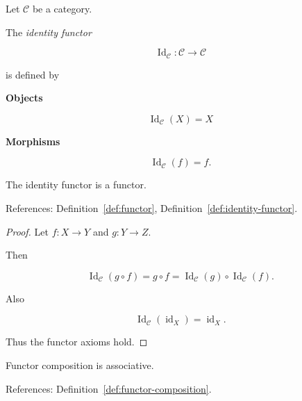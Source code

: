 \begin{definition}
\label{def:identity-functor}

Let $\mathcal{C}$ be a category.

The \emph{identity functor}

$$
\operatorname{Id}_{\mathcal{C}} : \mathcal{C} \to \mathcal{C}
$$

is defined by

\textbf{Objects}

$$
\operatorname{Id}_{\mathcal{C}}(X) = X
$$

\textbf{Morphisms}

$$
\operatorname{Id}_{\mathcal{C}}(f) = f.
$$

\end{definition}

\begin{lemma}
\label{lem:identity-functor}

The identity functor is a functor.

References: Definition~\ref{def:functor}, Definition~\ref{def:identity-functor}.
\end{lemma}

\begin{proof}

Let $f : X \to Y$ and $g : Y \to Z$.

Then

$$
\operatorname{Id}_{\mathcal{C}}(g \circ f)
=
g \circ f
=
\operatorname{Id}_{\mathcal{C}}(g) \circ \operatorname{Id}_{\mathcal{C}}(f).
$$

Also

$$
\operatorname{Id}_{\mathcal{C}}(\operatorname{id}_X)
=
\operatorname{id}_X.
$$

Thus the functor axioms hold.

\end{proof}


\begin{proposition}
\label{prop:functor-associative}

Functor composition is associative.

References: Definition~\ref{def:functor-composition}.
\end{proposition}

